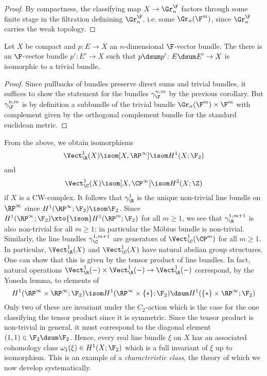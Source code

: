 \begin{proof}
	By compactness, the classifying map $X \to \Gr^{\F}_n$ factors through some finite stage in the filtration definining $\Gr^{\F}_n$, i.e. some $\Gr_n(\F^m)$, since $\Gr^{\F}_n$ carries the weak topology.
\end{proof}
\begin{corollary}
	Let $X$ be compact and $p\colon E \to X$ an $n$-dimensional $\F$-vector bundle.
	The there is an $\F$-vector bundle $p'\colon E' \to X$ such that $p \dsum p'\colon E \dsum E' \to X$ is isomorphic to a trivial bundle.
\end{corollary}
\begin{proof}
	Since pullbacks of bundles preserve direct sums and trivial bundles, it suffices to show the statement for the bundles $\gamma_{\F}^{n , m}$ by the previous corollary.
	But $\gamma_{\F}^{n, m}$ is by definition a subbundle of the trivial bundle $\Gr_n(\F^m) \times \F^m$ with complement given by the orthogonal complement bundle for the standard euclidean metric.
\end{proof}
\begin{example}
	From the above, we obtain isomorphisms
	\begin{equation*}
		\Vect_{\R}^1(X) \isom [X, \RP^\infty] \isom H^1(X; \F_2)
	\end{equation*}
	and
	\begin{equation*}
		\Vect_{\C}^1(X) \isom [X, \CP^\infty] \isom H^2(X; \Z)
	\end{equation*}
	if $X$ is a CW-complex.
	It follows that $\gamma_{\R}^1$ is the unique non-trivial line bundle on $\RP^\infty$ since $H^1(\RP^\infty; \F_2) \isom \F_2$.
	Since $H^1(\RP^\infty; \F_2) \xto{\isom} H^1(\RP^m; \F_2)$ for all $m \geq 1$, we see that $\gamma_{\R}^{1, m + 1}$ is also non-trivial for all $m \geq 1$; in particular the Möbius bundle is non-trivial.
	Similarly, the line bundles $\gamma_{\C}^{1, m + 1}$ are generators of $\Vect_{\C}^1(\CP^m)$ for all $m \geq 1$.
	In particular, $\Vect_{\R}^1(X)$ and $\Vect_{\C}^1(X)$ have natural abelian group structures.
	One can show that this is given by the tensor product of line bundles.
	In fact, natural operations $\Vect_{\R}^1({{-}}) \times \Vect_{\R}^1({{-}}) \to \Vect_{\R}^1({{-}})$ correspond, by the Yoneda lemma, to elements of
	\begin{equation*}
		H^1(\RP^\infty \times \RP^\infty; \F_2) \isom H^1(\RP^\infty \times \{*\}; \F_2) \dsum H^1(\{*\} \times \RP^\infty; \F_2)
	\end{equation*}
	Only two of these are invariant under the $C_2$-action which is the case for the one classifying the tensor product since it is symmetric.
	Since the tensor product is non-trivial in general, it must correspond to the diagonal element $(1, 1) \in \F_2 \dsum \F_2$.
	Hence, every real line bundle $\xi$ on $X$ has an associated cohomology class $\omega_1(\xi) \in H^1(X; \F_2)$ which is a full invariant of $\xi$ up to isomorphism.
	This is an example of a \emph{characteristic class}, the theory of which we now develop systematically.
\end{example}

